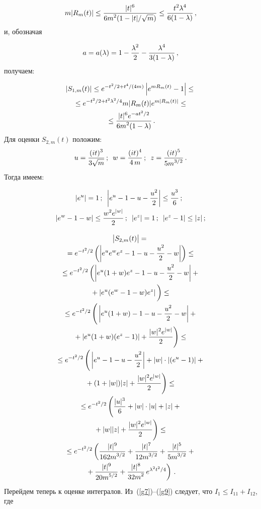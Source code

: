 \begin{multicols}{2}
\noindent
$$
m|R_m(t)|\leq \displaystyle\frac{\displaystyle   |t|^6\mathstrut}{\displaystyle   6m^2(1-|t|/\sqrt{m})\mathstrut}
\leq \displaystyle\frac{\displaystyle t^2\lambda^4\mathstrut}{\displaystyle 6(1- \lambda)\mathstrut}\,,
$$
и, обозначая 

\noindent
$$
a=a(\lambda)=1-\displaystyle\frac{\displaystyle \lambda^2\mathstrut}{\displaystyle 2\mathstrut} - \displaystyle\frac{\displaystyle \lambda^4\mathstrut}{\displaystyle 3(1-\lambda)\mathstrut}\,,
$$ 
получаем:

\noindent
\begin{multline}
\left|S_{1,m}(t)\right| \leq  e^{-t^2/2+t^4/(4m)} \left|e^{m R_m(t)}-1\right| \leq {}\\
{} \leq  e^{-t^2/2+t^2\lambda^2/4} m|R_m(t)| e^{m |R_m(t)|} 
\leq{}\\
{}\leq  \displaystyle\frac{\displaystyle |t|^6 e^{-at^2/2}\mathstrut}{\displaystyle 6m^2(1-\lambda)\mathstrut} \,.
\label{g8}
\end{multline}
%
 Для оценки $S_{2,m}(t)$ положим:
 $$
 u= \displaystyle\frac{\displaystyle (it)^3\mathstrut}{\displaystyle 3\sqrt{m}\mathstrut}\,;\enskip
w= \displaystyle\frac{\displaystyle (it)^4\mathstrut}{\displaystyle 4\,m\mathstrut}\,; \enskip z=\displaystyle\frac{\displaystyle (it)^5\mathstrut}{\displaystyle 5m^{3/2}\mathstrut}\,.
$$  
Тогда имеем:

\noindent
\begin{gather*}
|e^u|= 1\,;\enskip \left|e^u-1-u-\displaystyle\frac{\displaystyle u^2\mathstrut}{\displaystyle 2\mathstrut}\right|\leq \displaystyle\frac{\displaystyle u^3\mathstrut}{\displaystyle 6\mathstrut}\,;\enskip\\[-1pt]
|e^w-1-w|\leq \displaystyle\frac{\displaystyle w^2e^{|w|}\mathstrut}{\displaystyle 2\mathstrut}\,;\enskip |e^z|=1\,;\enskip |e^z - 1|\leq |z|\,;
\end{gather*}

\vspace*{-12pt}

\noindent
\begin{multline}
\big|S_{2,m}(t)\big|  ={}\\[-2pt]
{}=  e^{-t^2/2}\left(\left|e^u e^w e^z- 1 - u - \fr{u^2}{2} - w \right|\right)\leq{}\\[-1pt]
{} \leq e^{-t^2/2}\left(
\left|e^u (1+w) e^z- 1 - u - \fr{u^2}{2} - w \right| +{} \right.\\[-1pt]
\left.{} + \left|e^u(e^w - 1 -w)e^z\right| \vphantom{\fr{u^2}{2}}\right)\leq{}\\[-1pt]
{} \leq  e^{-t^2/2}\left(
\vphantom{\fr{|w|^2 e^{|w|}}{2}}\left|e^u(1+w) - 1 - u - \fr{u^2}{2} - w \right| + {}\right.\\[-1pt]
\left.{} + \left|e^u (1 + w)(e^z -1)\right|  +\fr{|w|^2e^{|w|}}{2}
\right)\leq{}\\[-1pt]
{} \leq  e^{-t^2/2}\left( 
\vphantom{\fr{|w|^2 e^{|w|}}{2}}
\left| e^u -1 - u - \fr{u^2}{2}\right| + |w|\cdot |(e^u - 1)| +{} \right.\\[-1pt]
\left.{} + (1+|w|)|z| + \fr{|w|^2 e^{|w|}}{2}\right)\leq{}\\[-1pt]
{} \leq  e^{-t^2/2}\left( \vphantom{\fr{|u|^3 e^{|w|}}{6}}
\fr{|u|^3}{6}+|w|\cdot |u|+ |z| +{}\right.\\[-1pt]
\left.{}+ |w||z| +\fr{|w|^2 e^{|w|}}{2}\right)\leq{}\\[-1pt]
{} \leq  e^{-t^2/2}\left(\fr{|t|^9}{162m^{3/2}}+\fr{|t|^7}{12m^{3/2}}+\fr{ |t|^5}{5m^{3/2}}+{}\right.\\[-1pt]
\left.{} + \fr{ |t|^9}{20m^{5/2}}+\fr{|t|^8}{32m^2}\, e^{\lambda^2 t^2 /4}\right)\,.
\label{g9}
\end{multline}
Перейдем теперь к оценке интегралов. Из~(\ref{g7})--(\ref{g9}) следует, 
что $I_1 \leq I_{11} +I_{12}$, где


\end{multicols}
